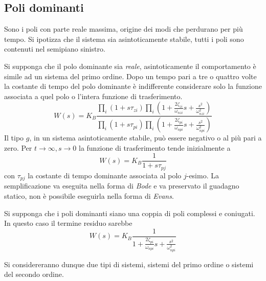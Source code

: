 \newpage
\subsection{Poli dominanti}
Sono i poli con parte reale massima, origine dei modi che perdurano per più
tempo.
Si ipotizza che il sistema sia asintoticamente stabile, tutti i poli sono
contenuti nel semipiano sinistro.

Si supponga che il polo dominante sia \textit{reale}, asintoticamente il
comportamento è simile ad un sistema del primo ordine. Dopo un tempo pari a tre
o quattro volte la costante di tempo del polo dominante è indifferente
considerare solo la funzione associata a quel polo o l'intera funzione di
trasferimento.
$$
W(s) = K_B \frac{\prod_i (1+s\tau_{zi})
\prod_i\left(1+\frac{2\zeta_{zi}}{\omega_{nzi}}s + \frac{s^2}{\omega_{nzi}^2}
\right)}{ \prod_i (1+s\tau_{pi})
\prod_i\left(1+\frac{2\zeta_{pi}}{\omega_{npi}}s + \frac{s^2}{\omega_{npi}^2}
\right)  }
$$
Il tipo $g$, in un sistema asintoticamente stabile, può essere negativo o al
più pari a zero. Per $t \to \infty, s\to 0$ la funzione di
trasferimento tende inizialmente a
$$W(s)=K_B\frac{1}{1+s\tau_{pj}}$$
con $\tau_{pj}$ la
costante di tempo dominante associata al polo $j$-esimo. La semplificazione va
eseguita nella forma di \textit{Bode} e va preservato il guadagno statico, non
è possibile eseguirla nella forma di \textit{Evans}.


Si supponga che i poli dominanti siano una coppia di poli complessi e coniugati.
In questo caso il termine residuo sarebbe
$$
W(s)=K_B \frac{1}{1+\frac{2\zeta_{pi}}{\omega_{npi}}s +
\frac{s^2}{\omega_{npi}^2}
}
$$

Si considereranno dunque due tipi di sistemi, sistemi del primo ordine o
sistemi del secondo ordine.
\newpage
